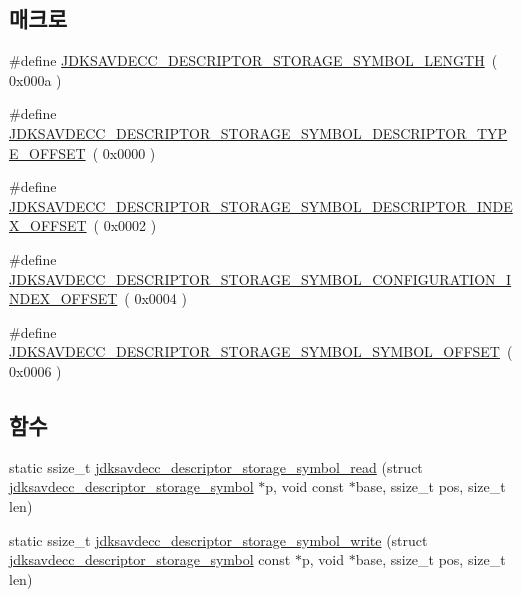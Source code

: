 \subsection*{매크로}
\begin{DoxyCompactItemize}
\item 
\#define \hyperlink{group__descriptor__storage__symbol_ga85d377aa36f28a057ec1261c2864dedb}{J\+D\+K\+S\+A\+V\+D\+E\+C\+C\+\_\+\+D\+E\+S\+C\+R\+I\+P\+T\+O\+R\+\_\+\+S\+T\+O\+R\+A\+G\+E\+\_\+\+S\+Y\+M\+B\+O\+L\+\_\+\+L\+E\+N\+G\+TH}~( 0x000a )
\item 
\#define \hyperlink{group__descriptor__storage__symbol_gac45abfc49f02d29c18e2e799d12e805a}{J\+D\+K\+S\+A\+V\+D\+E\+C\+C\+\_\+\+D\+E\+S\+C\+R\+I\+P\+T\+O\+R\+\_\+\+S\+T\+O\+R\+A\+G\+E\+\_\+\+S\+Y\+M\+B\+O\+L\+\_\+\+D\+E\+S\+C\+R\+I\+P\+T\+O\+R\+\_\+\+T\+Y\+P\+E\+\_\+\+O\+F\+F\+S\+ET}~( 0x0000 )
\item 
\#define \hyperlink{group__descriptor__storage__symbol_gafb70b42b94dd5944d92329d2c7a90654}{J\+D\+K\+S\+A\+V\+D\+E\+C\+C\+\_\+\+D\+E\+S\+C\+R\+I\+P\+T\+O\+R\+\_\+\+S\+T\+O\+R\+A\+G\+E\+\_\+\+S\+Y\+M\+B\+O\+L\+\_\+\+D\+E\+S\+C\+R\+I\+P\+T\+O\+R\+\_\+\+I\+N\+D\+E\+X\+\_\+\+O\+F\+F\+S\+ET}~( 0x0002 )
\item 
\#define \hyperlink{group__descriptor__storage__symbol_ga7c33f72a7c2dd5e241efa9c638e810ed}{J\+D\+K\+S\+A\+V\+D\+E\+C\+C\+\_\+\+D\+E\+S\+C\+R\+I\+P\+T\+O\+R\+\_\+\+S\+T\+O\+R\+A\+G\+E\+\_\+\+S\+Y\+M\+B\+O\+L\+\_\+\+C\+O\+N\+F\+I\+G\+U\+R\+A\+T\+I\+O\+N\+\_\+\+I\+N\+D\+E\+X\+\_\+\+O\+F\+F\+S\+ET}~( 0x0004 )
\item 
\#define \hyperlink{group__descriptor__storage__symbol_ga45495efb18350bd750d2ca6dac83da4d}{J\+D\+K\+S\+A\+V\+D\+E\+C\+C\+\_\+\+D\+E\+S\+C\+R\+I\+P\+T\+O\+R\+\_\+\+S\+T\+O\+R\+A\+G\+E\+\_\+\+S\+Y\+M\+B\+O\+L\+\_\+\+S\+Y\+M\+B\+O\+L\+\_\+\+O\+F\+F\+S\+ET}~( 0x0006 )
\end{DoxyCompactItemize}
\subsection*{함수}
\begin{DoxyCompactItemize}
\item 
static ssize\+\_\+t \hyperlink{group__descriptor__storage__symbol_gaeec6b1c9baca472aa2b9ca085ae70d21}{jdksavdecc\+\_\+descriptor\+\_\+storage\+\_\+symbol\+\_\+read} (struct \hyperlink{structjdksavdecc__descriptor__storage__symbol}{jdksavdecc\+\_\+descriptor\+\_\+storage\+\_\+symbol} $\ast$p, void const $\ast$base, ssize\+\_\+t pos, size\+\_\+t len)
\item 
static ssize\+\_\+t \hyperlink{group__descriptor__storage__symbol_ga6d687c31831e8b24d1245f02ecf9b2e7}{jdksavdecc\+\_\+descriptor\+\_\+storage\+\_\+symbol\+\_\+write} (struct \hyperlink{structjdksavdecc__descriptor__storage__symbol}{jdksavdecc\+\_\+descriptor\+\_\+storage\+\_\+symbol} const $\ast$p, void $\ast$base, ssize\+\_\+t pos, size\+\_\+t len)
\end{DoxyCompactItemize}


